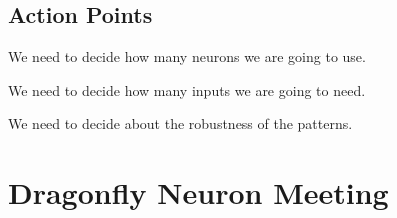 \documentclass{article}
\begin{document}
{\addtolength{\leftskip}{3mm}
\subsection*{Action Points}
}
\begin{compactenum}
\item We need to decide how many neurons we are going to use.
\item We need to decide how many inputs we are going to need.
\item We need to decide about the robustness of the patterns.
\end{compactenum}

\clearpage

\section*{Dragonfly Neuron Meeting}
\end{document}
